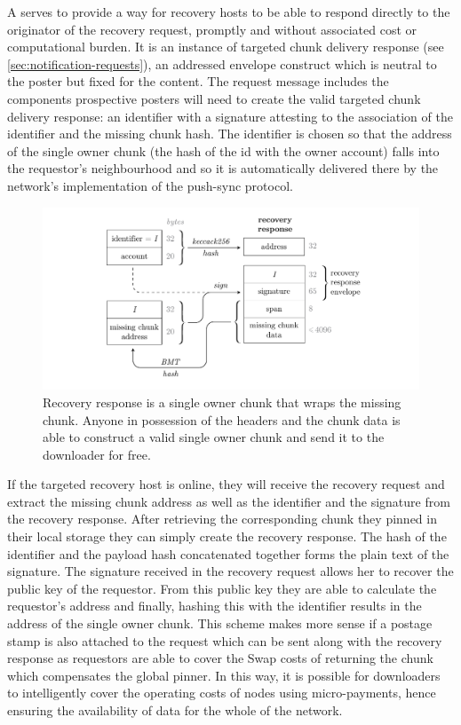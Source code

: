 A  serves to provide a way for recovery hosts to be able to respond directly to the originator of the recovery request, promptly and without associated cost or computational burden. It is an instance of targeted chunk delivery response (see \ref{sec:notification-requests}), an addressed envelope construct which is neutral to the poster but fixed for the content. The request message includes the components prospective posters will need to create the valid targeted chunk delivery response: an identifier with a signature attesting to the association of the identifier and the missing chunk hash. The identifier is chosen so that the address of the single owner chunk (the hash of the id with the owner account) falls into the requestor's neighbourhood and so it is automatically delivered there by the network's implementation of the push-sync protocol.

\begin{figure}[htbp]
\centering
\includegraphics[width=\textwidth]{fig/recovery-response-2.pdf}
\caption[Recovery response \statusgreen]{Recovery response is a single owner chunk that wraps the missing chunk. Anyone in possession of the headers and the chunk data is able to construct a valid single owner chunk and send it to the downloader for free.}
\label{fig:recovery-response}
\end{figure}

If the targeted recovery host is online, they will receive the recovery request and extract the missing chunk address as well as the identifier and the signature from the recovery response. After retrieving the corresponding chunk they pinned in their local storage they can simply create the recovery response. The hash of the identifier and the payload hash concatenated together forms the plain text of the signature. The signature received in the recovery request allows her to recover the public key of the requestor. From this public key they are able to calculate the requestor's address and finally, hashing this with the identifier results in the address of the single owner chunk. This scheme makes more sense if a postage stamp is also attached to the request which can be sent along with the recovery response as requestors are able to cover the Swap costs of returning the chunk which compensates the global pinner. In this way, it is possible for downloaders to intelligently cover the operating costs of nodes using micro-payments, hence ensuring the availability of data for the whole of the network.



